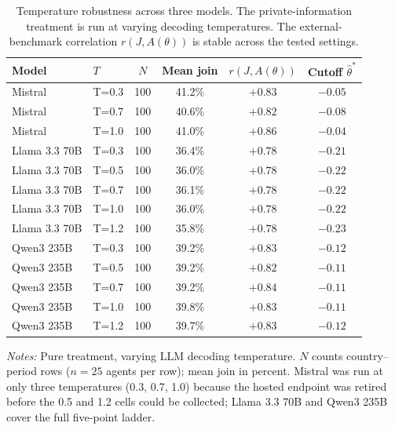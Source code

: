\begin{table}[t]
\centering
\caption{Temperature robustness across three models. The private-information treatment is run at varying decoding temperatures. The external-benchmark correlation $r(J, A(\theta))$ is stable across the tested settings.}
\label{tab:temperature_expanded}
\scriptsize
\setlength{\tabcolsep}{3pt}
\begin{tabular}{llcccc}
\toprule
Model & $T$ & $N$ & Mean join & $r(J, A(\theta))$ & Cutoff $\hat{\theta}^*$ \\
\midrule
Mistral & T=0.3 & 100 & 41.2\% & $+0.83$ & $-0.05$ \\
Mistral & T=0.7 & 100 & 40.6\% & $+0.82$ & $-0.08$ \\
Mistral & T=1.0 & 100 & 41.0\% & $+0.86$ & $-0.04$ \\
\midrule
Llama 3.3 70B & T=0.3 & 100 & 36.4\% & $+0.78$ & $-0.21$ \\
Llama 3.3 70B & T=0.5 & 100 & 36.0\% & $+0.78$ & $-0.22$ \\
Llama 3.3 70B & T=0.7 & 100 & 36.1\% & $+0.78$ & $-0.22$ \\
Llama 3.3 70B & T=1.0 & 100 & 36.0\% & $+0.78$ & $-0.22$ \\
Llama 3.3 70B & T=1.2 & 100 & 35.8\% & $+0.78$ & $-0.23$ \\
\midrule
Qwen3 235B & T=0.3 & 100 & 39.2\% & $+0.83$ & $-0.12$ \\
Qwen3 235B & T=0.5 & 100 & 39.2\% & $+0.82$ & $-0.11$ \\
Qwen3 235B & T=0.7 & 100 & 39.2\% & $+0.84$ & $-0.11$ \\
Qwen3 235B & T=1.0 & 100 & 39.8\% & $+0.83$ & $-0.11$ \\
Qwen3 235B & T=1.2 & 100 & 39.7\% & $+0.83$ & $-0.12$ \\
\bottomrule
\end{tabular}
\begin{tablenotes}
\footnotesize\emph{Notes:} Pure treatment, varying LLM decoding temperature. $N$ counts country--period rows ($n = 25$ agents per row); mean join in percent. Mistral was run at only three temperatures (0.3, 0.7, 1.0) because the hosted endpoint was retired before the 0.5 and 1.2 cells could be collected; Llama 3.3 70B and Qwen3 235B cover the full five-point ladder.
\end{tablenotes}
\end{table}
